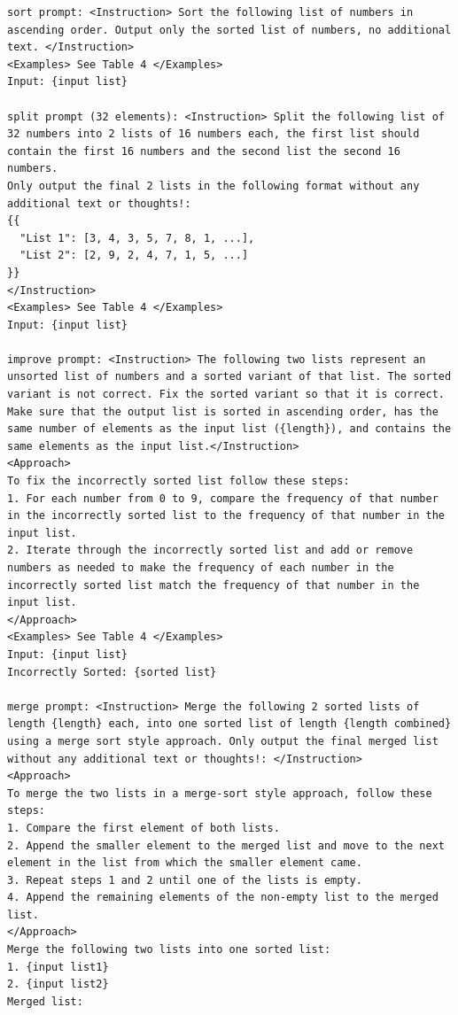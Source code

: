 \documentclass[11pt,UTF8,fontset=fandol]{ctexart}
\begin{document}
\begin{table}[H]\centering
\caption{排序任务的提示存根；位于单层花括号中的参数将在运行时被替换。}
\label{tab:3}
\end{table}
\begin{lstlisting}
sort prompt: <Instruction> Sort the following list of numbers in ascending order. Output only the sorted list of numbers, no additional text. </Instruction>
<Examples> See Table 4 </Examples>
Input: {input list}

split prompt (32 elements): <Instruction> Split the following list of 32 numbers into 2 lists of 16 numbers each, the first list should contain the first 16 numbers and the second list the second 16 numbers.
Only output the final 2 lists in the following format without any additional text or thoughts!:
{{
  "List 1": [3, 4, 3, 5, 7, 8, 1, ...],
  "List 2": [2, 9, 2, 4, 7, 1, 5, ...]
}}
</Instruction>
<Examples> See Table 4 </Examples>
Input: {input list}

improve prompt: <Instruction> The following two lists represent an unsorted list of numbers and a sorted variant of that list. The sorted variant is not correct. Fix the sorted variant so that it is correct. Make sure that the output list is sorted in ascending order, has the same number of elements as the input list ({length}), and contains the same elements as the input list.</Instruction>
<Approach>
To fix the incorrectly sorted list follow these steps:
1. For each number from 0 to 9, compare the frequency of that number in the incorrectly sorted list to the frequency of that number in the input list.
2. Iterate through the incorrectly sorted list and add or remove numbers as needed to make the frequency of each number in the incorrectly sorted list match the frequency of that number in the input list.
</Approach>
<Examples> See Table 4 </Examples>
Input: {input list}
Incorrectly Sorted: {sorted list}

merge prompt: <Instruction> Merge the following 2 sorted lists of length {length} each, into one sorted list of length {length combined} using a merge sort style approach. Only output the final merged list without any additional text or thoughts!: </Instruction>
<Approach>
To merge the two lists in a merge-sort style approach, follow these steps:
1. Compare the first element of both lists.
2. Append the smaller element to the merged list and move to the next element in the list from which the smaller element came.
3. Repeat steps 1 and 2 until one of the lists is empty.
4. Append the remaining elements of the non-empty list to the merged list.
</Approach>
Merge the following two lists into one sorted list:
1. {input list1}
2. {input list2}
Merged list:
\end{lstlisting}
\end{document}

